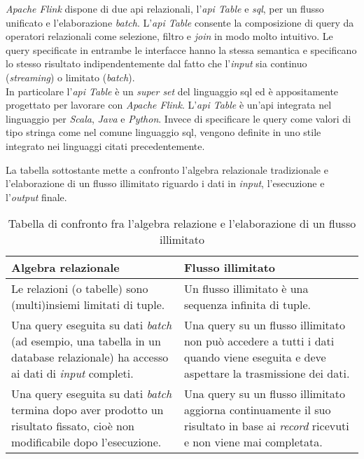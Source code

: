 \textit{Apache Flink} dispone di due \gls{api} relazionali, l'\textit{\gls{api} Table} e \textit{\gls{sql}}, per un flusso unificato e l'elaborazione \textit{batch}. L'\textit{\gls{api} Table} consente la composizione di \gls{query} da operatori relazionali come selezione, filtro e \textit{join} in modo molto intuitivo. Le \gls{query} specificate in entrambe le interfacce hanno la stessa semantica e specificano lo stesso risultato indipendentemente dal fatto che l'\textit{input} sia continuo (\textit{streaming}) o limitato (\textit{batch}).\\
In particolare l'\textit{\gls{api} Table} è un \textit{super set} del linguaggio \gls{sql} ed è appositamente progettato per lavorare con \textit{Apache Flink}. L'\textit{\gls{api} Table} è un'\gls{api} integrata nel linguaggio per \textit{Scala}, \textit{Java} e \textit{Python}. Invece di specificare le \gls{query} come valori di tipo stringa come nel comune linguaggio \gls{sql}, vengono definite in uno stile integrato nei linguaggi citati precedentemente.

La tabella sottostante mette a confronto l'algebra relazionale tradizionale e l'elaborazione di un flusso illimitato riguardo i dati in \textit{input}, l'esecuzione e l'\textit{output} finale.

\begin{table}[H]
\caption{Tabella di confronto fra l'algebra relazione e l'elaborazione di un flusso illimitato}
\label{tab:algebraRelazionale-flussoIllimitato}
\begin{tabularx}{\textwidth}{XX}
\hline
\textbf{Algebra relazionale} & \textbf{Flusso illimitato}\\
\hline
Le relazioni (o tabelle) sono (multi)insiemi limitati di tuple.     & Un flusso illimitato è una sequenza infinita di tuple. \\
\hline
Una \gls{query} eseguita su dati \textit{batch} (ad esempio, una tabella in un database relazionale) ha accesso ai dati di \textit{input} completi.    & Una \gls{query} su un flusso illimitato non può accedere a tutti i dati quando viene eseguita e deve aspettare la trasmissione dei dati. \\
\hline
Una \gls{query} eseguita su dati \textit{batch} termina dopo aver prodotto un risultato fissato, cioè non modificabile dopo l'esecuzione. & Una \gls{query} su un flusso illimitato aggiorna continuamente il suo risultato in base ai \textit{record} ricevuti e non viene mai completata. \\
\hline
\end{tabularx}
\end{table}%

